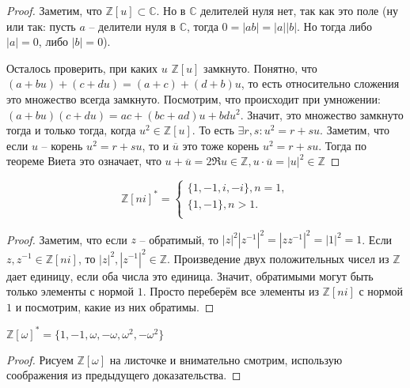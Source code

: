 \documentclass{article}
\begin{document}
\begin{proof}
    Заметим, что $\mathbb{Z}[u] \subset \mathbb{C}$. Но в $\mathbb{C}$ делителей нуля нет, так как это поле (ну или так:
    пусть $a$ -- делители нуля в $\mathbb{C}$, тогда $0 = |ab| = |a||b|$. Но тогда либо $|a| = 0$, либо $|b| = 0$).

    Осталось проверить, при каких $u$ $\mathbb{Z}[u]$ замкнуто. Понятно, что $(a + bu) + (c + du) = (a + c) + (d + b)u$,
    то есть относительно сложения это множество всегда замкнуто. Посмотрим, что происходит при умножении:
    $(a + bu)(c + du) = ac + (bc + ad)u + bd u^2$. Значит, это множество замкнуто тогда и только тогда, когда $u^2 \in
    \mathbb{Z}[u]$. То есть $\exists r, s: u^2 = r + su$. Заметим, что если $u$ -- корень $u^2 = r + su$, то и
    $\overline u$ это тоже корень $u^2 = r + su$. Тогда по теореме Виета это означает, что $u + \overline u = 2 \Re u \in
    \mathbb{Z}, u \cdot \overline u = |u|^2 \in \mathbb{Z}$
\end{proof}

\begin{statement}
    \[
        \mathbb{Z}[ni]^* = 
        \begin{cases}
            \{1, -1, i, -i\}, n = 1, \\
            \{1, -1\}, n > 1. \\
        \end{cases}
    \]
\end{statement}

\begin{proof}
    Заметим, что если $z$ -- обратимый, то $|z|^2 |z^{-1}|^2 = |zz^{-1}|^2 = |1|^2 = 1$. Если $z, z^{-1} \in \mathbb{Z}[ni]$,
    то $|z|^2, |z^{-1}|^2 \in \mathbb{Z}$. Произведение двух положительных чисел из $\mathbb{Z}$ дает единицу, если оба
    числа это единица. Значит, обратимыми могут быть только элементы с нормой $1$. Просто переберём все элементы из
    $\mathbb{Z}[ni]$ с нормой $1$ и посмотрим, какие из них обратимы.
\end{proof}

\begin{statement}
    $\mathbb{Z}[\omega]^* = \{1, -1, \omega, -\omega, \omega^2, -\omega^2\}$
\end{statement}

\begin{proof}
    Рисуем $\mathbb{Z}[\omega]$ на листочке и внимательно смотрим, использую соображения из предыдущего доказательства.
\end{proof}
\end{document}
